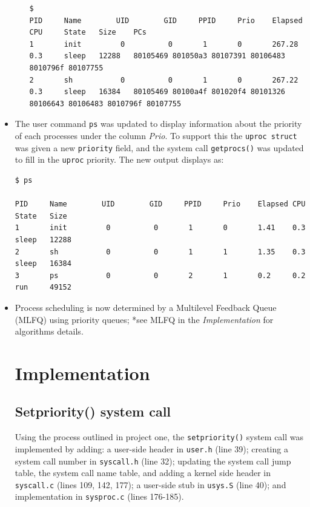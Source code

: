 \documentclass[11pt,letterpaper]{report}
\begin{document}
\begin{itemize}
\begin{itemize}
\noindent \begin{verbatim}
$
PID     Name        UID        GID     PPID     Prio    Elapsed CPU     State   Size    PCs
1       init         0          0       1       0       267.28  0.3     sleep   12288   80105469 801050a3 80107391 80106483 8010796f 80107755
2       sh           0          0       1       0       267.22  0.3     sleep   16384   80105469 80100a4f 801020f4 80101326 80106643 80106483 8010796f 80107755
\end{verbatim}
	
	\end{itemize}
	
	\item The user command {\tt ps} was updated to display information about the priority of each processes under the 
	column \emph{Prio}. To support this the {\tt uproc struct} was given
		a new {\tt priority} field, and the system call {\tt getprocs()} was updated to fill in the {\tt uproc} priority. The new output displays as:

\begin{verbatim}
$ ps

PID     Name        UID        GID     PPID     Prio    Elapsed CPU     State   Size
1       init         0          0       1       0       1.41    0.3     sleep   12288
2       sh           0          0       1       1       1.35    0.3     sleep   16384
3       ps           0          0       2       1       0.2     0.2     run     49152
\end{verbatim}

	\item Process scheduling is now determined by a Multilevel Feedback Queue (MLFQ) using priority queues; *see MLFQ in the \emph{Implementation} for algorithms details. 	
\newpage	

	\section*{Implementation}
	
	
	\subsection*{Setpriority() system call}
	Using the process outlined in project one, the {\tt setpriority()} system call was implemented by adding: a user-side header in {\tt user.h} (line 39); 
	creating a system call number in {\tt syscall.h} (line 32); updating the system call jump table, the system call name table, and adding a kernel side
	header in {\tt syscall.c} (lines 109, 142, 177); a user-side stub in {\tt usys.S} (line 40); and implementation in {\tt sysproc.c} (lines 176-185). 
	

\end{itemize}
\end{document}
